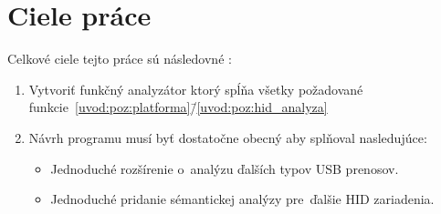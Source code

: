 \section{Ciele práce}

Celkové ciele tejto práce sú následovné :

\begin{enumerate}[label=\textbf{C\arabic*}]
	\item \label{uvod:ciel:aplikacia} Vytvoriť funkčný analyzátor ktorý spĺňa všetky požadované funkcie~\ref{uvod:poz:platforma}\=/\ref{uvod:poz:hid_analyza}
	\item \label{uvod:ciel:rozsiritelnost} Návrh programu musí byť dostatočne obecný aby splňoval nasledujúce:
	\begin{itemize}
		\item \label{uvod:ciel:roz_USB} Jednoduché rozšírenie o~analýzu ďalších typov USB prenosov.
		\item \label{uvod:ciel:roz_HID} Jednoduché pridanie sémantickej analýzy pre~ďalšie HID zariadenia.
	\end{itemize}
\end{enumerate}